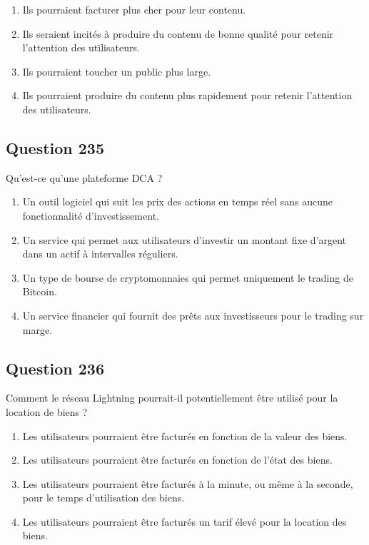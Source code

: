 \documentclass[12pt,a4paper]{article}
\begin{document}
\begin{enumerate}[label=\Alph*., leftmargin=*]
\item Ils pourraient facturer plus cher pour leur contenu.
\item Ils seraient incités à produire du contenu de bonne qualité pour retenir l'attention des utilisateurs.
\item Ils pourraient toucher un public plus large.
\item Ils pourraient produire du contenu plus rapidement pour retenir l'attention des utilisateurs.
\end{enumerate}

\bigskip


\subsection*{Question 235}
Qu'est-ce qu'une plateforme DCA ?

\begin{enumerate}[label=\Alph*., leftmargin=*]
\item Un outil logiciel qui suit les prix des actions en temps réel sans aucune fonctionnalité d'investissement.
\item Un service qui permet aux utilisateurs d'investir un montant fixe d'argent dans un actif à intervalles réguliers.
\item Un type de bourse de cryptomonnaies qui permet uniquement le trading de Bitcoin.
\item Un service financier qui fournit des prêts aux investisseurs pour le trading sur marge.
\end{enumerate}

\bigskip


\subsection*{Question 236}
Comment le réseau Lightning pourrait-il potentiellement être utilisé pour la location de biens ?

\begin{enumerate}[label=\Alph*., leftmargin=*]
\item Les utilisateurs pourraient être facturés en fonction de la valeur des biens.
\item Les utilisateurs pourraient être facturés en fonction de l'état des biens.
\item Les utilisateurs pourraient être facturés à la minute, ou même à la seconde, pour le temps d'utilisation des biens.
\item Les utilisateurs pourraient être facturés un tarif élevé pour la location des biens.
\end{enumerate}
\end{document}
